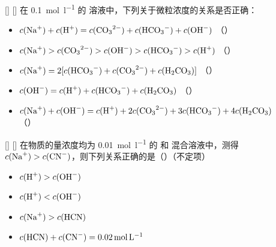     \begin{xmp}
        [专题——溶液中的微粒浓度比较例 4]
        {}
        []
        []
        在 \SI{0.1}{\mole\per\litre} 的  溶液中，下列关于微粒浓度的关系是否正确：
        \begin{itemize}
            \item[A.] \(c(\cemh{Na+}) + c(\cemh{H+}) = c(\cemh{CO3^2-}) + c(\cemh{HCO3^-}) + c(\cemh{OH^-})\) \dotfill（\makebox[1.5em]{\hxmark}）
            \item[B.] \(c(\cemh{Na+}) > c(\cemh{CO3^2-}) > c(\cemh{OH^-}) > c(\cemh{HCO3^-}) > c(\cemh{H+})\) \dotfill（\makebox[1.5em]{\hcmark}）
            \item[C.] \(c(\cemh{Na+}) = 2[c(\cemh{HCO3^-}) + c(\cemh{CO3^2-}) + c(\cemh{H2CO3})]\) \dotfill（\makebox[1.5em]{\hcmark}）
            \item[D.] \(c(\cemh{OH^-}) = c(\cemh{H+}) + c(\cemh{HCO3^-}) + c(\cemh{H2CO3})\) \dotfill（\makebox[1.5em]{\hxmark}）
            \item[E.] \(c(\cemh{Na+}) + c(\cemh{OH^-}) = c(\cemh{H+}) + 2c(\cemh{CO3^2-}) + 3c(\cemh{HCO3^-}) + 4c(\cemh{H2CO3})\) \\
            \null\dotfill（\makebox[1.5em]{\hcmark}）
        \end{itemize}
    \end{xmp}

    \begin{xmp}
        [专题——溶液中的微粒浓度比较例 5]
        {}
        []
        []
        在物质的量浓度均为 \SI{0.01}{\mole\per\litre} 的  和  混合溶液中，测得 \(c(\cemh{Na+}) > c(\cemh{CN^-})\)，则下列关系正确的是（）（不定项）
        \begin{itemize}
            \item[A.] \(c(\cemh{H+}) > c(\cemh{OH^-})\)
            \item[B.] \(c(\cemh{H+}) < c(\cemh{OH^-})\)
            \item[C.] \(c(\cemh{Na+}) > c(\cemh{HCN})\)
            \item[D.] \(c(\cemh{HCN}) + c(\cemh{CN^-}) = \SI{0.02}{\mole\per\litre}\)
        \end{itemize}
    \end{xmp}

